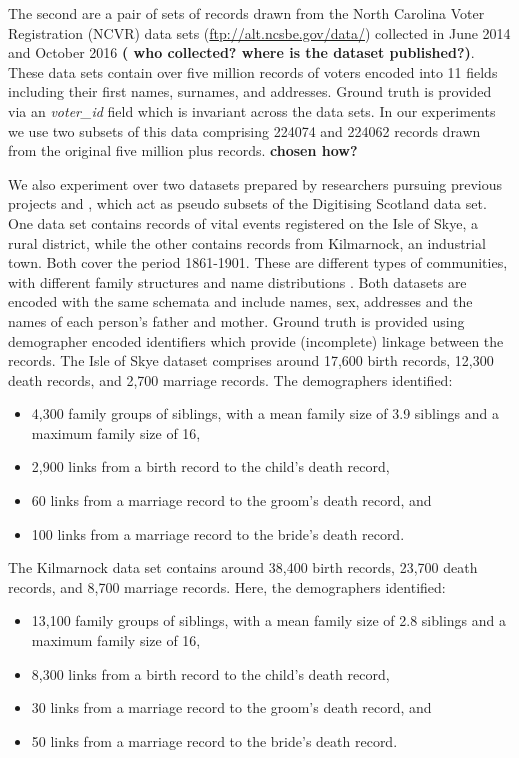 \documentclass{llncs}
\begin{document}

The second are a pair of sets of records drawn from the North Carolina Voter Registration (NCVR) data
sets (\url{ftp://alt.ncsbe.gov/data/}) collected in June 2014 and October 2016
 \textbf{( who collected? where is the dataset published?)}.
These data sets contain over five million records of voters encoded into 11 fields including
their first names, surnames, and addresses. Ground truth is provided via an \textit{voter\_id} field which is invariant across the data sets.
In our experiments we use two subsets of this data comprising 224074 and 224062 records drawn from the original five million plus records. \textbf{chosen how?}

We also experiment over two datasets prepared by researchers pursuing previous projects \cite{reid2002} and \cite{reid2006}, which act as pseudo subsets of the Digitising Scotland data set. One data set contains records of vital events registered on the Isle of Skye, a rural district, while the other contains records from Kilmarnock, an industrial town. Both cover the period 1861-1901. These are different types of communities, with different family structures and name distributions \cite{reid2002}. Both datasets are encoded with the same schemata and include names, sex, addresses and the names of each person's father and mother. Ground truth is provided using demographer encoded identifiers which provide (incomplete) linkage between the records.  The Isle of Skye dataset comprises around 17,600 birth records, 12,300 death records, and 2,700 marriage records.
The demographers  identified:
\begin{itemize}
\item 4,300 family groups of siblings, with a mean family size of 3.9 siblings and a maximum family size of 16,
\item 2,900 links from a birth record to the child's death record,
\item 60 links from a marriage record to the groom's death record, and
\item 100 links from a marriage record to the bride's death record.
\end{itemize}
The Kilmarnock data set contains around 38,400 birth records, 23,700 death records, and 8,700 marriage records. Here, the demographers identified:
\begin{itemize}
\item 13,100 family groups of siblings, with a mean family size of 2.8 siblings and a  maximum family size of 16,
\item 8,300 links from a birth record to the child's death record,
\item 30 links from a marriage record to the groom's death record, and
\item 50 links from a marriage record to the bride's death record.
\end{itemize}
\end{document}
